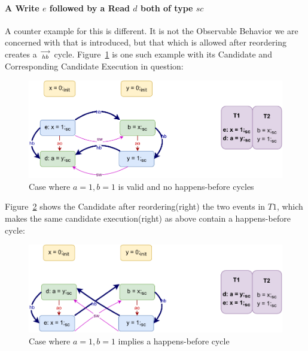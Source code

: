         
    \paragraph{A Write $e$ followed by a Read $d$ both of type $sc$}
        
        A counter example for this is different. 
        It is not the Observable Behavior we are concerned with that is introduced, but that which is allowed after reordering creates a $\stackrel{\longrightarrow}{_{hb}}$ cycle. 
        Figure~\ref{reord_counter:example3(a)} is one such example with its Candidate and Corresponding Candidate Execution in question:
        \begin{figure}[H]
            \centering
            \includegraphics[scale=0.7]{7.CounterExamples/ReorderingCandidate/Example5(Wsc-Rsc).pdf}
            \caption{Case where $a = 1, b = 1$ is valid and no happens-before cycles}
            \label{reord_counter:example3(a)}
        \end{figure}

        Figure~\ref{reord_counter:example3(b)} shows the Candidate after reordering(right) the two events in $T1$, which makes the same candidate execution(right) as above contain a happens-before cycle:
        \begin{figure}[H]
            \centering
            \includegraphics[scale=0.7]{7.CounterExamples/ReorderingCandidate/Example5R(Wsc-Rsc).pdf}
            \caption{Case where $a = 1, b = 1$ implies a happens-before cycle}
            \label{reord_counter:example3(b)}
        \end{figure}

